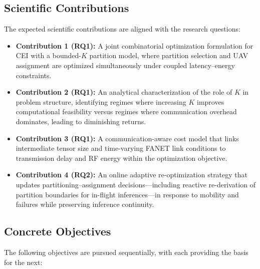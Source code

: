 \subsection*{Scientific Contributions}
The expected scientific contributions are aligned with the research questions:
\begin{itemize}
  \item \textbf{Contribution 1 (RQ1):} A joint combinatorial optimization formulation for CEI with a bounded-$K$ partition model, where partition selection and UAV assignment are optimized simultaneously under coupled latency--energy constraints.

  \item \textbf{Contribution 2 (RQ1):} An analytical characterization of the role of $K$ in problem structure, identifying regimes where increasing $K$ improves computational feasibility versus regimes where communication overhead dominates, leading to diminishing returns.

  \item \textbf{Contribution 3 (RQ1):} A communication-aware cost model that links intermediate tensor size and time-varying FANET link conditions to transmission delay and RF energy within the optimization objective.

  \item \textbf{Contribution 4 (RQ2):} An online adaptive re-optimization strategy that updates partitioning--assignment decisions---including reactive re-derivation of partition boundaries for in-flight inferences---in response to mobility and failures while preserving inference continuity.
\end{itemize}

\subsection*{Concrete Objectives}
The following objectives are pursued sequentially, with each providing the basis for the next:

